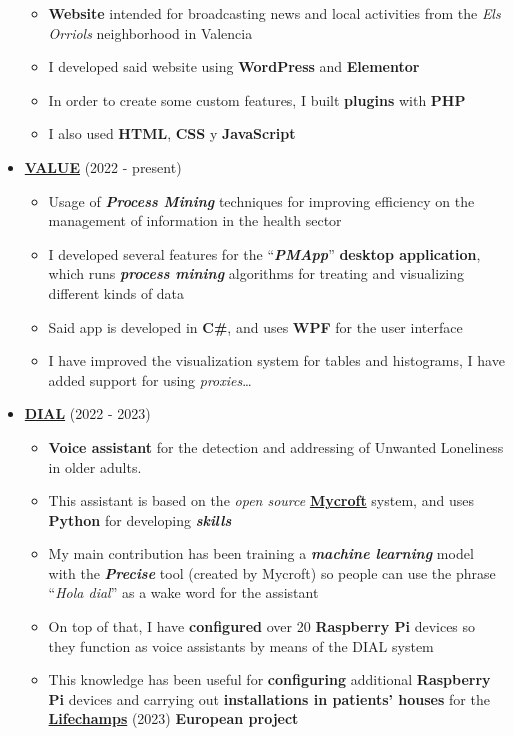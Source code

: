 \documentclass[letterpaper, 12pt, dvipsnames]{article}
\begin{document}
\begin{itemize}
\begin{itemize}
              \item \textbf{Website} intended for broadcasting news and local activities from the \emph{Els Orriols} neighborhood in Valencia
              \item I developed said website using \textbf{WordPress} and \textbf{Elementor}
              \item In order to create some custom features, I built \textbf{plugins} with \textbf{PHP}
              \item I also used \textbf{HTML}, \textbf{CSS} y \textbf{JavaScript}
          \end{itemize}
    \item {\large\textbf{\href{https://www.sabien.upv.es/project/value/}{VALUE}}} (2022 - present)
          \begin{itemize}
              \item Usage of \textbf{\emph{Process Mining}} techniques for improving efficiency on the management of information in the health sector
              \item I developed several features for the ``\textbf{\emph{PMApp}}'' \textbf{desktop application}, which runs \textbf{\emph{process mining}} algorithms for treating and visualizing different kinds of data
              \item Said app is developed in \textbf{C\#}, and uses \textbf{WPF} for the user interface
              \item I have improved the visualization system for tables and histograms, I have added support for using \emph{proxies}\dots
          \end{itemize}
    \item {\large\textbf{\href{http://www.sabien.upv.es/project/dial/}{DIAL}}} (2022 - 2023)
          \begin{itemize}
              \item \textbf{Voice assistant} for the detection and addressing of Unwanted Loneliness in older adults.
              \item This assistant is based on the \emph{open source} \textbf{\href{https://mycroft.ai/}{Mycroft}} system, and uses \textbf{Python} for developing \textbf{\emph{skills}}
              \item My main contribution has been training a \textbf{\emph{machine learning}} model with the \textbf{\emph{Precise}} tool (created by Mycroft) so people can use the phrase ``\emph{Hola dial}'' as a wake word for the assistant
              \item On top of that, I have \textbf{configured} over 20 \textbf{Raspberry Pi} devices so they function as voice assistants by means of the DIAL system
              \item This knowledge has been useful for \textbf{configuring} additional \textbf{Raspberry Pi} devices and carrying out \textbf{installations in patients' houses} for the \textbf{\href{http://www.sabien.upv.es/project/lifechamps/}{Lifechamps}} (2023) \textbf{European project}
          \end{itemize}
\end{itemize}
\end{document}
